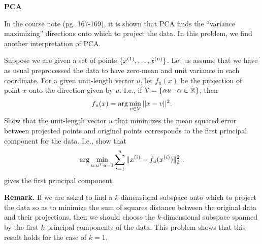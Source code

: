 \item {} {\bf PCA} 

In the course note (pg. 167-169), it is shown that PCA finds the ``variance maximizing'' directions onto
which to project the data.  In this problem, we find another interpretation of PCA. 

Suppose we are given a set of points $\{x^{(1)},\ldots,x^{(\nexp)}\}$. Let us
assume that we have as usual preprocessed the data to have zero-mean and unit variance
in each coordinate.  For a given unit-length vector $u$, let $f_u(x)$ be the 
projection of point $x$ onto the direction given by $u$.  I.e., if 
${\cal V} = \{\alpha u : \alpha \in \Re\}$, then 
\[
f_u(x) = \arg \min_{v\in {\cal V}} ||x-v||^2.
\]
Show that the unit-length vector $u$ that minimizes the 
mean squared error between projected points and original points corresponds
to the first principal component for the data. I.e., show that
$$ \arg \min_{u:u^Tu=1} \sum_{i=1}^\nexp \|x^{(i)}-f_u(x^{(i)})\|_2^2 \ .$$
gives the first principal component.


{\bf Remark.} If we are asked to find a $k$-dimensional subspace onto which to
project the data so as to minimize the sum of squares distance between the
original data and their projections, then we should choose the $k$-dimensional
subspace spanned by the first $k$ principal components of the data.  This problem
shows that this result holds for the case of $k=1$.

\ifnum{} {
  
} \fi

  
